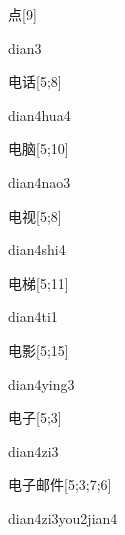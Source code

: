 \begin{verbete}[dian3]{点}[9]
\begin{pronuncia}{dian3}
\end{pronuncia}
\end{verbete}

\begin{verbete}{电话}[5;8]
\begin{pronuncia}{dian4hua4}
\end{pronuncia}
\end{verbete}

\begin{verbete}{电脑}[5;10]
\begin{pronuncia}{dian4nao3}
\end{pronuncia}
\end{verbete}

\begin{verbete}{电视}[5;8]
\begin{pronuncia}{dian4shi4}
\end{pronuncia}
\end{verbete}

\begin{verbete}[dian4ti1]{电梯}[5;11]
\begin{pronuncia}{dian4ti1}
\end{pronuncia}
\end{verbete}

\begin{verbete}{电影}[5;15]
\begin{pronuncia}{dian4ying3}
\end{pronuncia}
\end{verbete}

\begin{verbete}[dian4zi3]{电子}[5;3]
\begin{pronuncia}{dian4zi3}
\end{pronuncia}
\end{verbete}

\begin{verbete}{电子邮件}[5;3;7;6]
\begin{pronuncia}[\\]{dian4zi3you2jian4}
\end{pronuncia}
\end{verbete}

